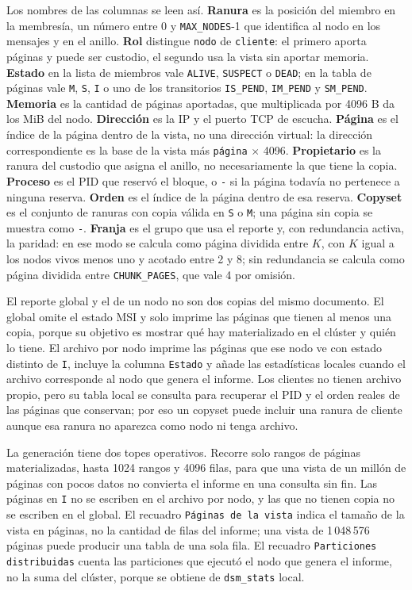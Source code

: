 Los nombres de las columnas se leen así. \textbf{Ranura} es la posición del miembro en la membresía, un número entre 0 y \texttt{MAX\_NODES}-1 que identifica al nodo en los mensajes y en el anillo. \textbf{Rol} distingue \texttt{nodo} de \texttt{cliente}: el primero aporta páginas y puede ser custodio, el segundo usa la vista sin aportar memoria. \textbf{Estado} en la lista de miembros vale \texttt{ALIVE}, \texttt{SUSPECT} o \texttt{DEAD}; en la tabla de páginas vale \texttt{M}, \texttt{S}, \texttt{I} o uno de los transitorios \texttt{IS\_PEND}, \texttt{IM\_PEND} y \texttt{SM\_PEND}. \textbf{Memoria} es la cantidad de páginas aportadas, que multiplicada por 4096 B da los MiB del nodo. \textbf{Dirección} es la IP y el puerto TCP de escucha. \textbf{Página} es el índice de la página dentro de la vista, no una dirección virtual: la dirección correspondiente es la base de la vista más \texttt{página} $\times$ 4096. \textbf{Propietario} es la ranura del custodio que asigna el anillo, no necesariamente la que tiene la copia. \textbf{Proceso} es el PID que reservó el bloque, o \texttt{-} si la página todavía no pertenece a ninguna reserva. \textbf{Orden} es el índice de la página dentro de esa reserva. \textbf{Copyset} es el conjunto de ranuras con copia válida en \texttt{S} o \texttt{M}; una página sin copia se muestra como \texttt{-}. \textbf{Franja} es el grupo que usa el reporte y, con redundancia activa, la paridad: en ese modo se calcula como página dividida entre $K$, con $K$ igual a los nodos vivos menos uno y acotado entre 2 y 8; sin redundancia se calcula como página dividida entre \texttt{CHUNK\_PAGES}, que vale 4 por omisión.

El reporte global y el de un nodo no son dos copias del mismo documento. El global omite el estado MSI y solo imprime las páginas que tienen al menos una copia, porque su objetivo es mostrar qué hay materializado en el clúster y quién lo tiene. El archivo por nodo imprime las páginas que ese nodo ve con estado distinto de \texttt{I}, incluye la columna \texttt{Estado} y añade las estadísticas locales cuando el archivo corresponde al nodo que genera el informe. Los clientes no tienen archivo propio, pero su tabla local se consulta para recuperar el PID y el orden reales de las páginas que conservan; por eso un copyset puede incluir una ranura de cliente aunque esa ranura no aparezca como nodo ni tenga archivo.

La generación tiene dos topes operativos. Recorre solo rangos de páginas materializadas, hasta 1024 rangos y 4096 filas, para que una vista de un millón de páginas con pocos datos no convierta el informe en una consulta sin fin. Las páginas en \texttt{I} no se escriben en el archivo por nodo, y las que no tienen copia no se escriben en el global. El recuadro \texttt{Páginas de la vista} indica el tamaño de la vista en páginas, no la cantidad de filas del informe; una vista de 1\,048\,576 páginas puede producir una tabla de una sola fila. El recuadro \texttt{Particiones distribuidas} cuenta las particiones que ejecutó el nodo que genera el informe, no la suma del clúster, porque se obtiene de \texttt{dsm\_stats} local.

